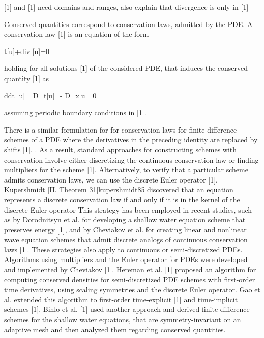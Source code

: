 \documentclass{article}
\begin{document}
{{  [1] and [1] need domains and ranges, also explain that divergence is only in [1]}

Conserved quantities correspond to conservation laws, admitted by the PDE. A conservation law [1] is an equation of the form

	{ }{ t}[u]+{div} [u]=0

holding for all solutions [1] of the considered PDE,
that induces the conserved quantity [1] as

	{d}{dt} [u]= D_t[u]=- D_x[u]=0

assuming periodic boundary conditions in [1].

There is a similar formulation for
for conservation laws for finite difference schemes of a PDE  where the derivatives in the preceding identity are replaced by shifts [1].  . As a result, standard approaches for constructing schemes with conservation involve either discretizing the continuous conservation law or finding multipliers for the scheme [1].
Alternatively, 
to verify that a particular scheme admits conservation laws, we can use the  discrete Euler operator [1]. Kupershmidt [II. Theorem 31]{kupershmidt85} discovered that an equation represents a discrete conservation law if and only if it is in the kernel of the discrete Euler operator
This strategy has been employed in recent studies, such as by Dorodnitsyn et al. for developing a shallow water equation scheme that preserves energy [1], and by Cheviakov et al. for creating linear and nonlinear wave equation schemes that admit discrete analogs of continuous conservation laws [1].
These strategies also apply to continuous or semi-discretized PDEs. Algorithms using multipliers and the Euler operator for PDEs were developed and implemented by Cheviakov [1]. Hereman et al. [1] proposed an algorithm for computing conserved densities for semi-discretized PDE schemes with first-order time derivatives, using scaling symmetries and the discrete Euler operator. Gao et al. extended this algorithm to first-order time-explicit [1] and time-implicit schemes [1].
Bihlo et al. [1] used another approach and derived finite-difference schemes for the shallow water equations, that are symmetry-invariant on an adaptive mesh and then analyzed them regarding conserved quantities.

}
\end{document}
